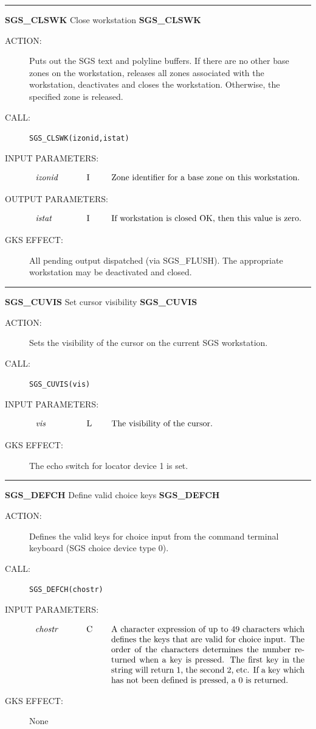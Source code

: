 \documentclass[11pt]{article}
\newcommand{\htmlref}[2]{#1}
\newcommand{\xlabel}[1]{}
\newcommand{\rthead}[2]{\rule{\textwidth}{0.3mm}
{\Large {\bf #1} \hfill #2 \hfill {\bf #1}}}
\newenvironment{params}%
{\[\begin{tabular}{p{0.14\textwidth}p{0.05\textwidth}p{0.66\textwidth}}}%
{\end{tabular}\]}
\newcommand{\rparams}[3]{{\em #1} &#2 &#3\\}
\newcommand{\rthead}[2]{\subsection{\label{#1}\xlabel{#1}#1 - #2}}
\newenvironment{params}{\begin{description}}{\end{description}}
\newcommand{\rparams}[3]{\item{{\em #1}} (#2) #3}
\begin{document}
\rthead{SGS\_CLSWK}{Close workstation}
\begin{description}
\item [ACTION:]
Puts out the SGS text and polyline buffers.
If there are no other base zones on the workstation, releases all zones
associated with the workstation, deactivates and closes the workstation.
Otherwise, the specified zone is released.
\item [CALL:]
{\tt SGS\_CLSWK(izonid,istat)}
\item [INPUT PARAMETERS:]
\begin{params}
\rparams{izonid}{I}{Zone identifier for a base zone on this workstation.}
\end{params}
\item [OUTPUT PARAMETERS:]
\begin{params}
\rparams{istat}{I}{If workstation is closed OK, then this value is zero.}
\end{params}
\item [GKS EFFECT:]
All pending output dispatched (via \htmlref{SGS\_FLUSH}{SGS_FLUSH}).
The appropriate workstation may be deactivated and closed.
\end{description}
\goodbreak

\rthead{SGS\_CUVIS}{Set cursor visibility}
\begin{description}
\item [ACTION:]
Sets the visibility of the cursor on the current SGS workstation.
\item [CALL:]
{\tt SGS\_CUVIS(vis)}
\item [INPUT PARAMETERS:]
\begin{params}
\rparams{vis}{L}{The visibility of the cursor.}
\end{params}
\item [GKS EFFECT:]
The echo switch for locator device 1 is set.
\end{description}
\goodbreak

\rthead{SGS\_DEFCH}{Define valid choice keys}
\begin{description}
\item [ACTION:]
Defines the valid keys for choice input from the command terminal
keyboard (SGS choice device type 0).
\item [CALL:]
{\tt SGS\_DEFCH(chostr)}
\item [INPUT PARAMETERS:]
\begin{params}
\rparams{chostr}{C}{A character expression of up to 49 characters which defines
the keys that are valid for choice input. The order of the characters
determines the number returned when a key is pressed. The first key in the
string will return 1, the second 2, etc. If a key which has not been defined
is pressed, a 0 is returned.}
\end{params}
\item [GKS EFFECT:]
None
\end{description}
\goodbreak
\end{document}
